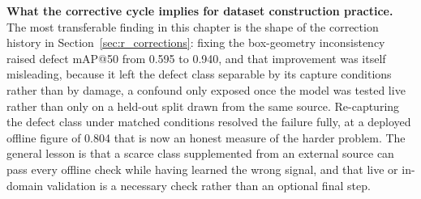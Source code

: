 \textbf{What the corrective cycle implies for dataset construction practice.} The most transferable finding in this chapter is the shape of the correction history in Section~\ref{sec:r_corrections}: fixing the box-geometry inconsistency raised defect mAP@50 from 0.595 to 0.940, and that improvement was itself misleading, because it left the defect class separable by its capture conditions rather than by damage, a confound only exposed once the model was tested live rather than only on a held-out split drawn from the same source. Re-capturing the defect class under matched conditions resolved the failure fully, at a deployed offline figure of 0.804 that is now an honest measure of the harder problem. The general lesson is that a scarce class supplemented from an external source can pass every offline check while having learned the wrong signal, and that live or in-domain validation is a necessary check rather than an optional final step.

\clearpage
